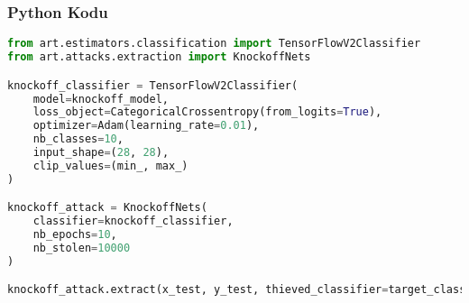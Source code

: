 \subsubsection{Python Kodu}

\begin{lstlisting}[language=Python]
from art.estimators.classification import TensorFlowV2Classifier
from art.attacks.extraction import KnockoffNets

knockoff_classifier = TensorFlowV2Classifier(
    model=knockoff_model, 
    loss_object=CategoricalCrossentropy(from_logits=True), 
    optimizer=Adam(learning_rate=0.01),
    nb_classes=10,
    input_shape=(28, 28),
    clip_values=(min_, max_)
)

knockoff_attack = KnockoffNets(
    classifier=knockoff_classifier, 
    nb_epochs=10,
    nb_stolen=10000
)

knockoff_attack.extract(x_test, y_test, thieved_classifier=target_classifier)
\end{lstlisting}

\newpage